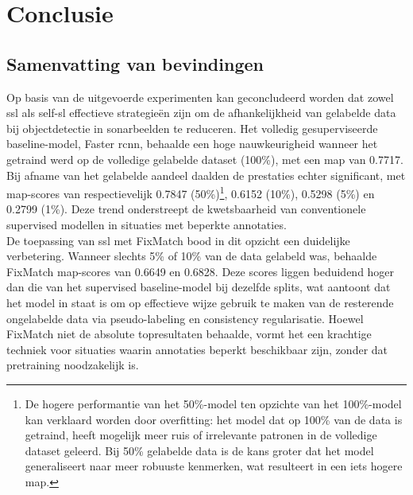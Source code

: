 
\chapter{Conclusie}%
\label{ch:conclusie}

\section{Samenvatting van bevindingen}

Op basis van de uitgevoerde experimenten kan geconcludeerd worden dat zowel \gls{ssl} als \gls{self-sl} effectieve strategieën zijn om de afhankelijkheid van gelabelde data bij objectdetectie in sonarbeelden te reduceren. Het volledig gesuperviseerde baseline-model, Faster \gls{rcnn}, behaalde een hoge nauwkeurigheid wanneer het getraind werd op de volledige gelabelde dataset (100\%), met een \gls{map} van 0.7717. Bij afname van het gelabelde aandeel daalden de prestaties echter significant, met \gls{map}-scores van respectievelijk 0.7847 (50\%)\footnote{De hogere performantie van het 50\%-model ten opzichte van het 100\%-model kan verklaard worden door \gls{overfitting}: het model dat op 100\% van de data is getraind, heeft mogelijk meer ruis of irrelevante patronen in de volledige dataset geleerd. Bij 50\% gelabelde data is de kans groter dat het model generaliseert naar meer robuuste kenmerken, wat resulteert in een iets hogere \gls{map}.}, 0.6152 (10\%), 0.5298 (5\%) en 0.2799 (1\%). Deze trend onderstreept de kwetsbaarheid van conventionele supervised modellen in situaties met beperkte annotaties. \\

De toepassing van \gls{ssl} met FixMatch bood in dit opzicht een duidelijke verbetering. Wanneer slechts 5\% of 10\% van de data gelabeld was, behaalde FixMatch \gls{map}-scores van 0.6649 en 0.6828. Deze scores liggen beduidend hoger dan die van het supervised baseline-model bij dezelfde splits, wat aantoont dat het model in staat is om op effectieve wijze gebruik te maken van de resterende ongelabelde data via pseudo-labeling en consistency regularisatie. Hoewel FixMatch niet de absolute topresultaten behaalde, vormt het een krachtige techniek voor situaties waarin annotaties beperkt beschikbaar zijn, zonder dat pretraining noodzakelijk is. \\

